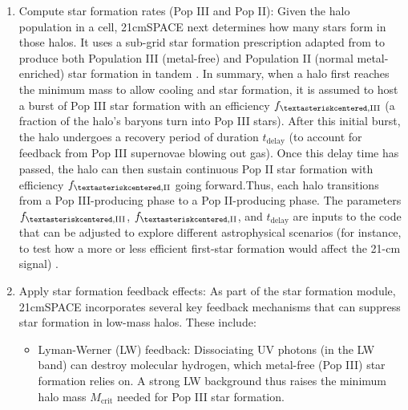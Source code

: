 \documentclass[floats,floatfix,showpacs,amssymb,prd,superscriptaddress,nofootinbib]{revtex4-2} %
\newcommand{\red}{\textcolor{red}}
\begin{document}
\begin{enumerate}
    \item Compute star formation rates (Pop III and Pop II): Given the halo population in a cell, 21cmSPACE next determines how many stars form in those halos. It uses a sub-grid star formation prescription adapted from \citet{Magg_2022} to produce both Population III (metal-free) and Population II (normal metal-enriched) star formation in tandem \citep{gessey-jones_2024}. In summary, when a halo first reaches the minimum mass to allow cooling and star formation, it is assumed to host a burst of Pop III star formation with an efficiency $f_{\textasteriskcentered,\text{III}}$ (a fraction of the halo’s baryons turn into Pop III stars). After this initial burst, the halo undergoes a recovery period of duration $t_{\text{delay}}$ (to account for feedback from Pop III supernovae blowing out gas). Once this delay time has passed, the halo can then sustain continuous Pop II star formation with efficiency $f_{\textasteriskcentered,\text{II}}$ going forward.Thus, each halo transitions from a Pop III-producing phase to a Pop II-producing phase. The parameters $f_{\textasteriskcentered,\text{III}}$, $f_{\textasteriskcentered,\text{II}}$, and $t_{\text{delay}}$ are inputs to the code that can be adjusted to explore different astrophysical scenarios (for instance, to test how a more or less efficient first-star formation would affect the 21-cm signal) \citep{gessey-jones_2024}. 
    

    \item Apply star formation feedback effects: As part of the star formation module, 21cmSPACE incorporates several key feedback mechanisms that can suppress star formation in low-mass halos. These include:
    \begin{itemize}
        \item Lyman-Werner (LW) feedback: Dissociating UV photons (in the LW band) can destroy molecular hydrogen, which metal-free (Pop III) star formation relies on. A strong LW background thus raises the minimum halo mass $M_{\text{crit}}$ needed for Pop III star formation.


\end{itemize}
\end{enumerate}
\end{document}
